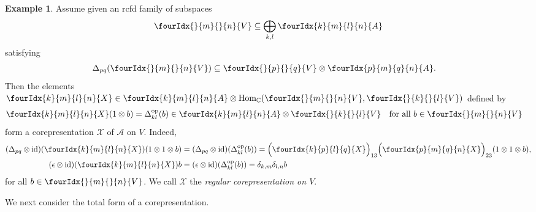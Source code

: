 \documentclass[11pt]{article}
\DeclareMathOperator{\id}{id}
\DeclareMathOperator{\Hom}{Hom}
\DeclareMathOperator{\op}{\mathrm{op}}
\newcommand{\C}{\mathbb{C}}
\newcommand{\Gr}[5]{\fourIdx{#2}{#4}{#3}{#5}{#1}}%
\newcommand{\Gru}[3]{\Gr{#1}{}{}{#2}{#3}}
\theoremstyle{definition}
\newtheorem{Exa}[Theorem]{Example}
\numberwithin{equation}{section}
\begin{document}
\begin{Exa} \label{example:rep-regular}
  Assume  given an rcfd family of subspaces
  \begin{align*}
    \Gru{V}{m}{n} \subseteq \bigoplus_{k,l} \Gr{A}{k}{l}{m}{n}
  \end{align*}
  satisfying
  \begin{align} \label{eq:rep-regular-inclusion}
    \Delta_{pq}(\Gru{V}{m}{n}) &\subseteq \Gru{V}{p}{q} \otimes
    \Gr{A}{p}{q}{m}{n}.
  \end{align}
Then the  elements $\Gr{X}{k}{l}{m}{n} \in \Gr{A}{k}{l}{m}{n} \otimes
  \Hom_{\C}(\Gru{V}{m}{n},\Gru{V}{k}{l})$ defined by 
  \begin{align*}
    \Gr{X}{k}{l}{m}{n}(1 \otimes b) &= \Delta^{\op}_{kl}(b) \in
    \Gr{A}{k}{l}{m}{n} \otimes \Gru{V}{k}{l} \quad
    \text{for all } b\in \Gru{V}{m}{n}
  \end{align*}
  form a corepresentation $\mathscr{X}$ of $\mathscr{A}$ on
  $V$. Indeed, 
  \begin{align*}
    (\Delta_{pq} \otimes \id)(\Gr{X}{k}{l}{m}{n})(1 \otimes 1 \otimes
    b) &=(\Delta_{pq}\otimes \id)(\Delta^{\op}_{kl}(b)) =
    \Big{(}\Gr{X}{k}{l}{p}{q}\Big{)}_{13}\Big{(}\Gr{X}{p}{q}{m}{n}\Big{)}_{23}(1
    \otimes 1 \otimes b), \\
    (\epsilon \otimes \id)(\Gr{X}{k}{l}{m}{n})b &= (\epsilon \otimes
    \id)(\Delta^{\op}_{kl}(b)) = \delta_{k,m}\delta_{l,n}b
  \end{align*}
  for all $b\in \Gru{V}{m}{n}$.  We call $\mathscr{X}$ the
  \emph{regular corepresentation on $V$}. 
\end{Exa}

We next consider the total form of a corepresentation.
\end{document}
